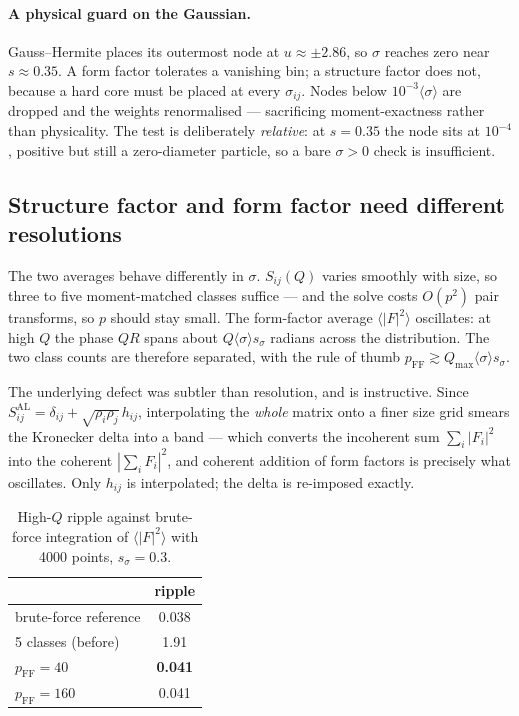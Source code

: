 \documentclass[11pt,a4paper]{article}
\begin{document}
\paragraph{A physical guard on the Gaussian.} Gauss--Hermite places its
outermost node at $u\approx\pm2.86$, so $\sigma$ reaches zero near
$s\approx0.35$. A form factor tolerates a vanishing bin; a structure factor
does not, because a hard core must be placed at every $\sigma_{ij}$. Nodes
below $10^{-3}\langle\sigma\rangle$ are dropped and the weights renormalised
--- sacrificing moment-exactness rather than physicality. The test is
deliberately \emph{relative}: at $s=0.35$ the node sits at $10^{-4}$, positive
but still a zero-diameter particle, so a bare $\sigma>0$ check is insufficient.

\subsection{Structure factor and form factor need different resolutions}
\label{sec:nff}

The two averages behave differently in $\sigma$. $S_{ij}(Q)$ varies smoothly
with size, so three to five moment-matched classes suffice --- and the solve
costs $O(p^2)$ pair transforms, so $p$ should stay small. The form-factor
average $\langle|F|^2\rangle$ oscillates: at high $Q$ the phase $QR$ spans
about $Q\langle\sigma\rangle s_\sigma$ radians across the distribution. The
two class counts are therefore separated, with the rule of thumb
$p_{\mathrm{FF}}\gtrsim Q_{\max}\langle\sigma\rangle s_\sigma$.

The underlying defect was subtler than resolution, and is instructive. Since
$S^{\mathrm{AL}}_{ij}=\delta_{ij}+\sqrt{\rho_i\rho_j}\,h_{ij}$, interpolating
the \emph{whole} matrix onto a finer size grid smears the Kronecker delta into
a band --- which converts the incoherent sum $\sum_i|F_i|^2$ into the coherent
$|\sum_i F_i|^2$, and coherent addition of form factors is precisely what
oscillates. Only $h_{ij}$ is interpolated; the delta is re-imposed exactly.

\begin{table}[htbp]
\centering
\caption{High-$Q$ ripple against brute-force integration of
$\langle|F|^2\rangle$ with 4000 points, $s_\sigma=0.3$.}
\begin{tabular}{lc}
\toprule
 & ripple\\
\midrule
brute-force reference        & 0.038\\
5 classes (before)           & 1.91\\
$p_{\mathrm{FF}}=40$         & \textbf{0.041}\\
$p_{\mathrm{FF}}=160$        & 0.041\\
\bottomrule
\end{tabular}
\end{table}
\end{document}
